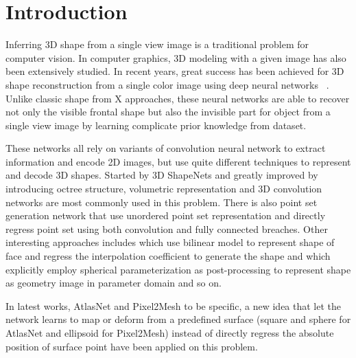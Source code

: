 \section{Introduction}
Inferring 3D shape from a single view image is a traditional problem for computer vision. In computer graphics, 3D modeling with a given image has also been extensively studied.  In recent years, great success has been achieved for 3D shape reconstruction from a single color image using deep neural networks~\cite{3DR2N2,PSGN} . Unlike classic shape from X  approaches, these neural networks are able to recover not only the visible frontal shape but also the invisible part for object from a single view image by learning complicate prior knowledge from dataset. 

These networks all rely on variants of convolution neural network to extract information and encode 2D images, but use quite different techniques to represent and decode 3D shapes. Started by 3D ShapeNets\cite{3dshapenet} and greatly improved by introducing octree structure\cite{octreegen}, volumetric representation and 3D convolution networks are most commonly used in this problem. There is also point set generation network\cite{PSGN} that use unordered point set representation and directly regress point set using both convolution and fully connected breaches. Other interesting approaches includes \cite{endface} which use bilinear model to represent shape of face and regress the interpolation coefficient to generate the shape and \cite{surfnet} which explicitly employ spherical parameterization as post-processing to represent shape as geometry image in parameter domain and so on.

In latest works, AtlasNet\cite{atlasnet} and Pixel2Mesh\cite{pixel2mesh} to be specific, a new idea that let the network learns to map or deform from a predefined surface (square and sphere for AtlasNet and ellipsoid for Pixel2Mesh) instead of directly regress the absolute position of surface point have been applied on this problem.


